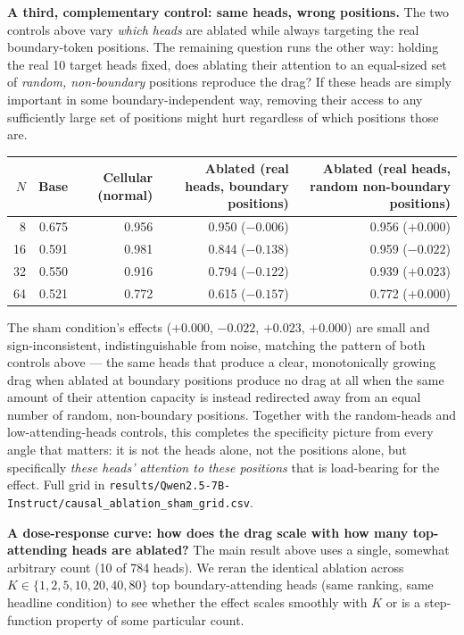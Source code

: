 \documentclass[11pt]{article}
\begin{document}
\textbf{A third, complementary control: same heads, wrong positions.} The two controls above vary \emph{which heads} are ablated while always targeting the real boundary-token positions. The remaining question runs the other way: holding the real 10 target heads fixed, does ablating their attention to an equal-sized set of \emph{random, non-boundary} positions reproduce the drag? If these heads are simply important in some boundary-independent way, removing their access to any sufficiently large set of positions might hurt regardless of which positions those are.

\begin{table}[htbp]
\centering
\small
\begin{tabular}{rrrrr}
\toprule
$N$ & Base & Cellular (normal) & Ablated (real heads, boundary positions) & Ablated (real heads, random non-boundary positions) \\
\midrule
8  & 0.675 & 0.956 & 0.950 ($-0.006$) & 0.956 ($+0.000$) \\
16 & 0.591 & 0.981 & 0.844 ($-0.138$) & 0.959 ($-0.022$) \\
32 & 0.550 & 0.916 & 0.794 ($-0.122$) & 0.939 ($+0.023$) \\
64 & 0.521 & 0.772 & 0.615 ($-0.157$) & 0.772 ($+0.000$) \\
\bottomrule
\end{tabular}
\end{table}

The sham condition's effects ($+0.000$, $-0.022$, $+0.023$, $+0.000$) are small and sign-inconsistent, indistinguishable from noise, matching the pattern of both controls above --- the same heads that produce a clear, monotonically growing drag when ablated at boundary positions produce no drag at all when the same amount of their attention capacity is instead redirected away from an equal number of random, non-boundary positions. Together with the random-heads and low-attending-heads controls, this completes the specificity picture from every angle that matters: it is not the heads alone, not the positions alone, but specifically \emph{these heads' attention to these positions} that is load-bearing for the effect. Full grid in \texttt{results/Qwen2.5-7B-Instruct/causal\_ablation\_sham\_grid.csv}.

\textbf{A dose-response curve: how does the drag scale with how many top-attending heads are ablated?} The main result above uses a single, somewhat arbitrary count (10 of 784 heads). We reran the identical ablation across $K \in \{1, 2, 5, 10, 20, 40, 80\}$ top boundary-attending heads (same ranking, same headline condition) to see whether the effect scales smoothly with $K$ or is a step-function property of some particular count.
\end{document}
